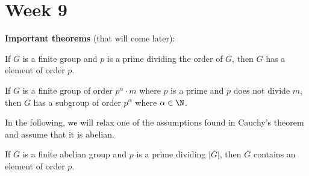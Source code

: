 \section{Week 9}

\textbf{Important theorems} (that will come later):

\begin{theorem}
   If \( G  \) is a finite group and \(  p \) is a prime dividing the order of \( G  \), then \( G  \) has a element of order \( p  \).
\end{theorem}

\begin{theorem}
    If \( G  \) is a finite group of order \( p^{\alpha } \cdot m  \) where \( p  \) is a prime and \( p   \) does not divide \( m  \), then \( G  \) has a subgroup of order \( p^{\alpha} \) where \( \alpha \in \N \).
\end{theorem}

In the following, we will relax one of the assumptions found in Cauchy's theorem and assume that it is abelian.

\begin{prop}
   If \( G  \) is a finite abelian group and \( p  \) is a prime dividing \( | G |   \), then \( G  \) contains an element of order \( p  \).
\end{prop}

